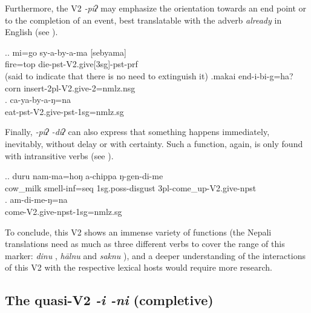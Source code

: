 Furthermore, the  V2 \emph{-piʔ} may emphasize the orientation towards an end point or to the completion of an event, best translatable with the adverb \emph{already} in English (see \Next).

\ex.\ag. mi=go sy-a-by-a-ma [sebyama]\\
 fire{\sc =top} die{\sc -pst-V2.give[3sg]-pst-prf}\\
   (said to indicate that there is no need to extinguish it)
\bg.makai end-i-bi-g=ha?\\
 corn insert{\sc -2pl-V2.give-2=nmlz.nsg}\\
 \bg. ca-ya-by-a-ŋ=na\\
 eat{\sc -pst-V2.give-pst-1sg=nmlz.sg}\\


Finally, \emph{-piʔ \ti -diʔ} can also express that something happens immediately,  inevitably, without delay or with certainty. Such a function, again, is only found with intransitive verbs (see \Next). 

	\ex.\ag. duru nam-ma=hoŋ a-chippa ŋ-gen-di-me\\
	cow\_milk smell{\sc -inf=seq} {\sc 1sg.poss-}disgust {\sc 3pl-}come\_up{\sc -V2.give-npst}\\
 	\bg. am-di-me-ŋ=na\\
		come{\sc -V2.give-npst-1sg=nmlz.sg}\\
	
To conclude, this V2 shows an immense variety of functions (the Nepali translations need as much as three different verbs to cover the range of this marker: \emph{dinu} , \emph{hālnu}  and \emph{saknu} ), and a deeper understanding of the interactions of this V2 with the respective lexical hosts would require more research.



\subsection{The quasi-V2 \emph{-i \ti -ni} (completive)}\label{V2-compl}

